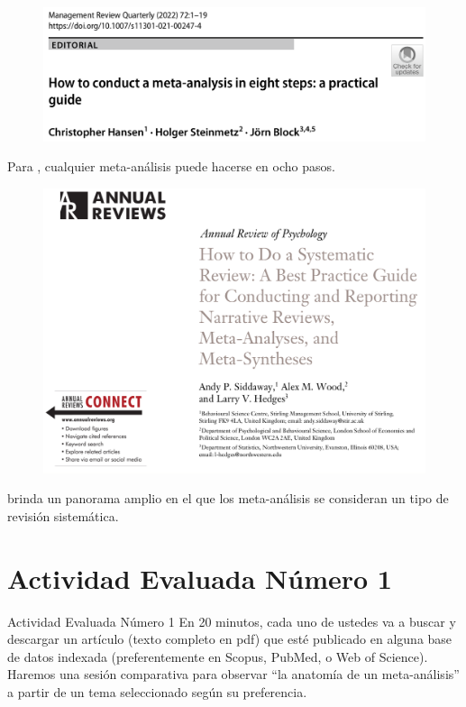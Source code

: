 \documentclass[aspectratio=169]{beamer}
\begin{document}
\begin{frame}
\begin{figure}
\centering
\includegraphics[width=0.9\linewidth]{Hansen.png}
\end{figure}
Para \textcite{Hansen2022}, cualquier meta-análisis puede hacerse en ocho pasos.
\end{frame}

\begin{frame}
\begin{figure}
\centering
\includegraphics[width=0.5\linewidth]{AR.png}
\end{figure}
\textcite{Siddaway2019} brinda un panorama amplio en el que los meta-análisis se consideran un tipo de revisión sistemática. 
\end{frame}

\section{Actividad Evaluada Número 1}
\begin{frame}{Actividad Evaluada Número 1}
En 20 minutos, cada uno de ustedes va a buscar y descargar un artículo (texto completo en pdf) que esté publicado en alguna base de datos indexada (preferentemente en Scopus, PubMed, o Web of Science).\\
\vspace{1cm}
Haremos una sesión comparativa para observar ``la anatomía de un meta-análisis'' a partir de un tema seleccionado según su preferencia.
\end{frame}
\end{document}
